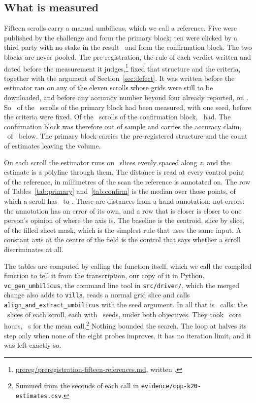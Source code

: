 \subsection{What is measured}

Fifteen scrolls carry a manual umbilicus, which we call a reference. Five were published by the
challenge and form the primary block; ten were clicked by a third party with no stake in the
result~\cite{drobkov} and form the confirmation block. The two blocks are never pooled. The
pre-registration, the rule of each verdict written and dated before the measurement it
judges,\footnote{\url{prereg/preregistration-fifteen-references.md}, written
\RevPreFifteenWritten.} fixed that structure and the criteria, together with the argument of
Section~\ref{sec:defect}. It was written before the estimator ran on any of the eleven scrolls
whose grids were still to be downloaded, and before any accuracy number beyond four already
reported, on \RevPreMeasuredPrimaryScrolls. So \RevPreMeasuredPrimary\ of the
\RevPreMeasuredPrimaryOf\ scrolls of the primary block had been measured, with one seed, before the
criteria were fixed. Of the \UmbConfirmScrolls\ scrolls of the confirmation block,
\RevPreMeasuredConfirm\ had. The confirmation block was therefore out of sample and carries the
accuracy claim, \RevKConfirmBeats\ of \UmbConfirmScrolls\ below. The primary block carries the
pre-registered structure and the count of estimates leaving the volume.

On each scroll the estimator runs on \RevFifteenSlices\ slices evenly spaced along $z$, and the
estimate is a polyline through them. The distance is read at every control point of the reference,
in millimetres of the scan the reference is annotated on. The row of Tables~\ref{tab:primary}
and~\ref{tab:confirm} is the median over those points, of which a scroll has \RevFifteenCpMin\ to
\RevFifteenCpMax. These are distances from a hand annotation, not errors: the annotation has an
error of its own, and a row that is closer is closer to one person's opinion of where the axis is.
The baseline is the centroid, slice by slice, of the filled sheet mask, which is the simplest rule
that uses the same input. A constant axis at the centre of the field is the control that says
whether a scroll discriminates at all.

The tables are computed by calling the function itself, which we call the compiled function to
tell it from the transcription, our copy of it in Python. \texttt{vc\_gen\_umbilicus}, the command
line tool in \texttt{src/driver/}, which the merged change also adds to \texttt{villa}, reads a
normal grid slice and calls
\texttt{align\_and\_extract\_umbilicus} with the seed argument. In all that is \RevCppEstimates\
calls: the \RevFifteenSlices\ slices of each scroll, each with \RevKSeeds\ seeds, under both
objectives. They took \RevCppCoreHours\ core hours, \RevCppMeanSeconds~s for the mean
call.\footnote{Summed from the seconds of each call in \texttt{evidence/cpp-k20-estimates.csv}.}
Nothing bounded the
search. The loop at  halves its step only when none of the eight probes improves,
it has no iteration limit, and it was left exactly so.

